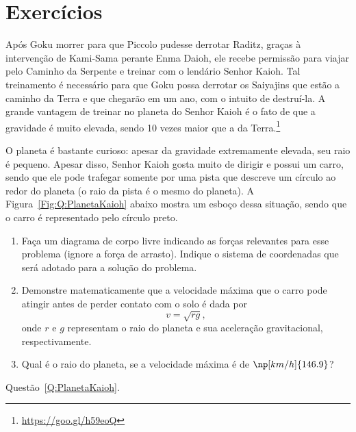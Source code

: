 
\section{Exercícios}

\begin{question}[type={exam}]\label{Q:PlanetaKaioh}
Após Goku morrer para que Piccolo pudesse derrotar Raditz, graças à intervenção de Kami-Sama perante Enma Daioh, ele recebe permissão para viajar pelo Caminho da Serpente e treinar com o lendário Senhor Kaioh. Tal treinamento é necessário para que Goku possa derrotar os Saiyajins que estão a caminho da Terra e que chegarão em um ano, com o intuito de destruí-la. A grande vantagem de treinar no planeta do Senhor Kaioh é o fato de que a gravidade é muito elevada, sendo 10 vezes maior que a da Terra.\footnote{\url{https://goo.gl/h59eoQ}}

O planeta é bastante curioso: apesar da gravidade extremamente elevada, seu raio é pequeno. Apesar disso, Senhor Kaioh gosta muito de dirigir e possui um carro, sendo que ele pode trafegar somente por uma pista que descreve um círculo ao redor do planeta (o raio da pista é o mesmo do planeta). A Figura~\ref{Fig:Q:PlanetaKaioh} abaixo mostra um esboço dessa situação, sendo que o carro é representado pelo círculo preto.
\begin{enumerate}[label=(\alph*)]
    \item Faça um diagrama de corpo livre indicando as forças relevantes para esse problema (ignore a força de arrasto). Indique o sistema de coordenadas que será adotado para a solução do problema.
    \item Demonstre matematicamente que a velocidade máxima que o carro pode atingir antes de perder contato com o solo é dada por
    \begin{displaymath}
        v = \sqrt{rg},
    \end{displaymath}
    onde $r$ e $g$ representam o raio do planeta e sua aceleração gravitacional, respectivamente. 
    \item Qual é o raio do planeta, se a velocidade máxima é de $\np[km/h]{146.9}$?
\end{enumerate}

\begin{marginfigure}
\centering
{}
\caption{Questão~\ref{Q:PlanetaKaioh}. \label{Fig:Q:PlanetaKaioh}}
\end{marginfigure}
\end{question}
%
%

